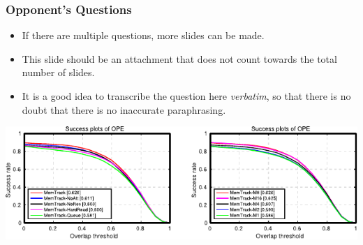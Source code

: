 


\appendix{}
\begin{frame}
  \frametitle{Opponent's Questions}
  \begin{itemize}
    \item If there are multiple questions, more slides can be made.
    \item This slide should be an attachment that does not count towards the total number of slides.
    \item It is a good idea to transcribe the question here \emph{verbatim}, so that there is no doubt that there is no inaccurate paraphrasing.
  \end{itemize}
  \bigskip
  \includegraphics[width=\textwidth]{img/template-ResultsPlot.pdf}
\end{frame}
